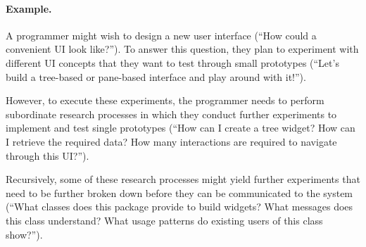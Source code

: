 \begin{example}
	\paragraph{Example.}
	A programmer might wish to design a new user interface (``How could a convenient UI look like?'').
	To answer this question, they plan to experiment with different UI concepts that they want to test through small prototypes (``Let's build a tree-based or pane-based interface and play around with it!'').

	However, to execute these experiments, the programmer needs to perform subordinate research processes in which they conduct further experiments to implement and test single prototypes (``How can I create a tree widget? How can I retrieve the required data? How many interactions are required to navigate through this UI?'').

	Recursively, some of these research processes might yield further experiments that need to be further broken down before they can be communicated to the system (``What classes does this package provide to build widgets? What messages does this class understand? What usage patterns do existing users of this class show?'').
\end{example}

